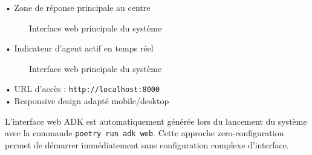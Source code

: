 • Zone de réponse principale au centre\\
\begin{figure}[H]
\centering
{}
\caption{Interface web principale du système}
\end{figure}
• Indicateur d'agent actif en temps réel\\[10pt]
\begin{figure}[H]
\centering
{}
\caption{Interface web principale du système}
\end{figure}
• URL d'accès : \texttt{http://localhost:8000}\\
• Responsive design adapté mobile/desktop

L'interface web ADK est automatiquement générée lors du lancement du système avec la commande \texttt{poetry run adk web}. Cette approche zero-configuration permet de démarrer immédiatement sans configuration complexe d'interface.

